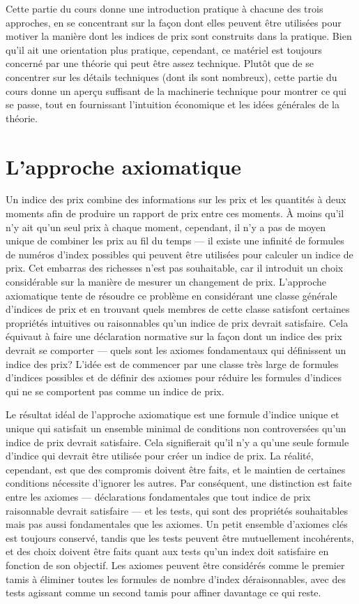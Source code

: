 \documentclass[]{article}
\begin{document}
Cette partie du cours donne une introduction pratique à chacune des trois approches, en se concentrant sur la façon dont elles peuvent être utilisées pour motiver la manière dont les indices de prix sont construits dans la pratique. Bien qu'il ait une orientation plus pratique, cependant, ce matériel est toujours concerné par une théorie qui peut être assez technique. Plutôt que de se concentrer sur les détails techniques (dont ils sont nombreux), cette partie du cours donne un aperçu suffisant de la machinerie technique pour montrer ce qui se passe, tout en fournissant l'intuition économique et les idées générales de la théorie.

\hypertarget{lapproche-axiomatique}{%
\section{L'approche axiomatique}\label{lapproche-axiomatique}}

Un indice des prix combine des informations sur les prix et les quantités à deux moments afin de produire un rapport de prix entre ces moments. À moins qu'il n'y ait qu'un seul prix à chaque moment, cependant, il n'y a pas de moyen unique de combiner les prix au fil du temps --- il existe une infinité de formules de numéros d'index possibles qui peuvent être utilisées pour calculer un indice de prix. Cet embarras des richesses n'est pas souhaitable, car il introduit un choix considérable sur la manière de mesurer un changement de prix. L'approche axiomatique tente de résoudre ce problème en considérant une classe générale d'indices de prix et en trouvant quels membres de cette classe satisfont certaines propriétés intuitives ou raisonnables qu'un indice de prix devrait satisfaire. Cela équivaut à faire une déclaration normative sur la façon dont un indice des prix devrait se comporter --- quels sont les axiomes fondamentaux qui définissent un indice des prix? L'idée est de commencer par une classe très large de formules d'indices possibles et de définir des axiomes pour réduire les formules d'indices qui ne se comportent pas comme un indice de prix.

Le résultat idéal de l'approche axiomatique est une formule d'indice unique et unique qui satisfait un ensemble minimal de conditions non controversées qu'un indice de prix devrait satisfaire. Cela signifierait qu'il n'y a qu'une seule formule d'indice qui devrait être utilisée pour créer un indice de prix. La réalité, cependant, est que des compromis doivent être faits, et le maintien de certaines conditions nécessite d'ignorer les autres. Par conséquent, une distinction est faite entre les axiomes --- déclarations fondamentales que tout indice de prix raisonnable devrait satisfaire --- et les tests, qui sont des propriétés souhaitables mais pas aussi fondamentales que les axiomes. Un petit ensemble d'axiomes clés est toujours conservé, tandis que les tests peuvent être mutuellement incohérents, et des choix doivent être faits quant aux tests qu'un index doit satisfaire en fonction de son objectif. Les axiomes peuvent être considérés comme le premier tamis à éliminer toutes les formules de nombre d'index déraisonnables, avec des tests agissant comme un second tamis pour affiner davantage ce qui reste.
\end{document}
